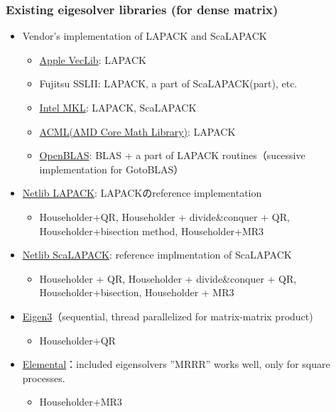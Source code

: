 \begin{frame}
  \frametitle{Existing eigesolver libraries (for dense matrix)}
  \begin{itemize}
  \item Vendor's implementation of LAPACK and ScaLAPACK
    \begin{itemize}
    \item \href{https://developer.apple.com/library/mac/documentation/Performance/Conceptual/vecLib/Reference/reference.html}{Apple VecLib}: LAPACK
    \item Fujitsu SSLII: LAPACK, a part of ScaLAPACK(part), etc.
    \item \href{https://software.intel.com/en-us/mkl_11.1_ref}{Intel MKL}: LAPACK, ScaLAPACK
    \item
      \href{http://developer.amd.com/tools-and-sdks/cpu-development/amd-core-math-library-acml/}{ACML(AMD
        Core Math Library)}: LAPACK
    \item \href{http://www.openblas.net}{OpenBLAS}: BLAS + a part of LAPACK routines（sucessive implementation for GotoBLAS）

    \end{itemize}
  \item \href{http://www.netlib.org/lapack/}{Netlib LAPACK}: LAPACKのreference implementation
    \begin{itemize}
      \item Householder+QR, Householder + divide\&conquer + QR, Householder+bisection method, Householder+MR3
    \end{itemize}
  \item \href{http://www.netlib.org/scalapack/}{Netlib ScaLAPACK}: reference implmentation of ScaLAPACK
    \begin{itemize}
      \item Householder + QR, Householder + divide\&conquer + QR, Householder+bisection, Householder + MR3
    \end{itemize}
  \item \href{http://eigen.tuxfamily.org/}{Eigen3}（sequential, thread parallelized for matrix-matrix product)
    \begin{itemize}
      \item Householder+QR
    \end{itemize}
  \item \href{http://libelemental.org}{Elemental}：included eigensolvers ''MRRR'' works well, only for square processes.
    \begin{itemize}
      \item Householder+MR3
    \end{itemize}
  \end{itemize}
\end{frame}

